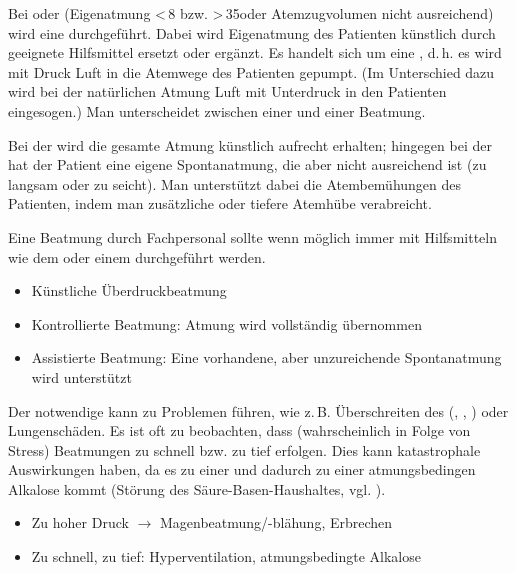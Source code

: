 \TextSlide{\TxBeschreibung}
{Bei  oder  (Eigenatmung \textless\,8 bzw.
\textgreater\,35\PerMin* oder Atemzugvolumen nicht
ausreichend) wird eine 
durchgeführt.
Dabei wird Eigenatmung des Patienten künstlich durch geeignete Hilfsmittel ersetzt oder ergänzt.
Es handelt sich um eine
,
d.\,h. es wird mit Druck Luft in die Atemwege des Patienten
gepumpt. (Im Unterschied dazu wird bei der natürlichen
Atmung Luft mit Unterdruck in den Patienten eingesogen.) Man
unterscheidet zwischen einer  und einer
 Beatmung.

Bei der 
wird die gesamte Atmung künstlich aufrecht erhalten;
hingegen bei der  hat der Patient eine eigene Spontanatmung, die
aber nicht ausreichend ist (zu langsam oder zu seicht). Man
unterstützt dabei die Atembemühungen des Patienten, indem
man zusätzliche oder tiefere Atemhübe verabreicht.

Eine Beatmung durch Fachpersonal sollte wenn möglich immer
mit Hilfsmitteln wie dem  oder einem
 durchgeführt werden.
}{
\begin{itemize}
  \item Künstliche Überdruckbeatmung
  \item Kontrollierte Beatmung: Atmung wird vollständig
  übernommen
  \item Assistierte Beatmung: Eine vorhandene, aber
  unzureichende Spontanatmung wird unterstützt
\end{itemize}
}{}{}{}

\TextSlide{\TxGefahren}
{Der notwendige  kann zu Problemen führen, wie
z.\,B. Überschreiten des 
(, , ) oder
Lungenschäden.
Es ist oft zu beobachten, dass (wahrscheinlich in Folge von
Stress) Beatmungen zu schnell bzw. zu tief erfolgen. Dies
kann katastrophale Auswirkungen haben, da es zu einer
 und dadurch zu einer atmungsbedingen
Alkalose kommt (Störung des Säure-Basen-Haushaltes, vgl.
).
}{
\begin{itemize}
  \item Zu hoher Druck $\rightarrow$ Magenbeatmung/-blähung,
  Erbrechen
  \item Zu schnell, zu tief: Hyperventilation,
  atmungsbedingte Alkalose
\end{itemize}
}{}{}{}

